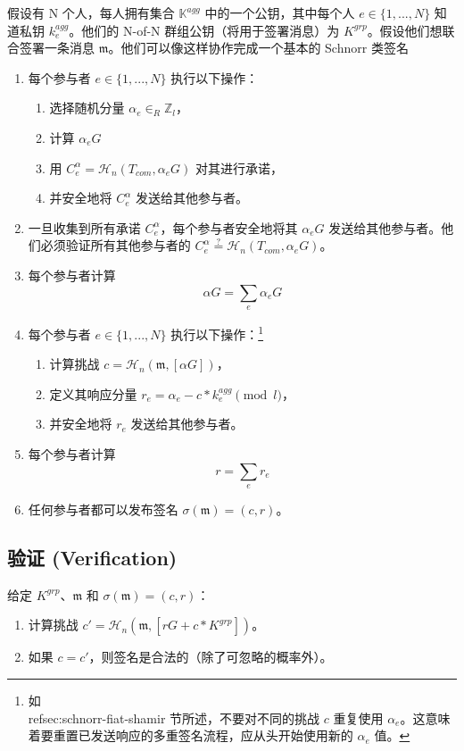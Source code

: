 假设有 N 个人，每人拥有集合 $\mathbb{K}^{agg}$ 中的一个公钥，其中每个人 $e \in \{1,...,N\}$ 知道私钥 $k^{agg}_e$。他们的 N-of-N 群组公钥（将用于签署消息）为 $K^{grp}$。假设他们想联合签署一条消息 $\mathfrak{m}$。他们可以像这样协作完成一个基本的 Schnorr 类签名
\begin{enumerate}
    \item 每个参与者 $e \in \{1,...,N\}$ 执行以下操作：
    \begin{enumerate}
        \item 选择随机分量 $\alpha_e \in_R \mathbb{Z}_l$，
        \item 计算 $\alpha_e G$
        \item 用 $C^{\alpha}_e = \mathcal{H}_n(T_{com},\alpha_e G)$ 对其进行承诺，
        \item 并安全地将 $C^{\alpha}_e$ 发送给其他参与者。
    \end{enumerate}
    \item 一旦收集到所有承诺 $C^{\alpha}_e$，每个参与者安全地将其 $\alpha_e G$ 发送给其他参与者。他们必须验证所有其他参与者的 $C^{\alpha}_e \stackrel{?}{=} \mathcal{H}_n(T_{com},\alpha_e G)$。
    \item 每个参与者计算
    \[ \alpha G = \sum_e \alpha_e G \]
    \item 每个参与者 $e \in \{1,...,N\}$ 执行以下操作：\footnote{如 \\ref{sec:schnorr-fiat-shamir} 节所述，不要对不同的挑战 $c$ 重复使用 $\alpha_e$。这意味着要重置已发送响应的多重签名流程，应从头开始使用新的 $\alpha_e$ 值。}
    \begin{enumerate}
        \item 计算挑战 $c = \mathcal{H}_n(\mathfrak{m},[\alpha G])$，
        \item 定义其响应分量 $r_e = \alpha_e - c* k^{agg}_e \pmod l$，
        \item 并安全地将 $r_e$ 发送给其他参与者。
    \end{enumerate}
    \item 每个参与者计算
    \[ r = \sum_e r_e\]
    \item 任何参与者都可以发布签名 $\sigma(\mathfrak{m}) = (c,r)$。
\end{enumerate}


\subsection*{验证 (Verification)}

给定 $K^{grp}$、$\mathfrak{m}$ 和 $\sigma(\mathfrak{m}) = (c,r)$：
\begin{enumerate}
    \item 计算挑战 $c' = \mathcal{H}_n(\mathfrak{m},[r G + c*K^{grp}])$。
    \item 如果 $c = c'$，则签名是合法的（除了可忽略的概率外）。
\end{enumerate}

